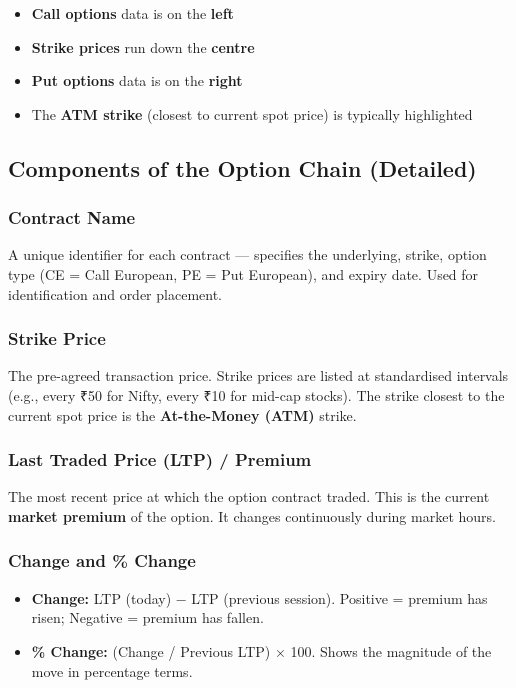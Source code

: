 \documentclass[12pt,openany]{book}
\begin{document}
\begin{itemize}[leftmargin=*]
    \item \textbf{Call options} data is on the \textbf{left}
    \item \textbf{Strike prices} run down the \textbf{centre}
    \item \textbf{Put options} data is on the \textbf{right}
    \item The \textbf{ATM strike} (closest to current spot price) is typically highlighted
\end{itemize}

\subsection{Components of the Option Chain (Detailed)}

\subsubsection{Contract Name}
A unique identifier for each contract — specifies the underlying, strike, option type (CE = Call European, PE = Put European), and expiry date. Used for identification and order placement.

\subsubsection{Strike Price}
The pre-agreed transaction price. Strike prices are listed at standardised intervals (e.g., every ₹50 for Nifty, every ₹10 for mid-cap stocks). The strike closest to the current spot price is the \textbf{At-the-Money (ATM)} strike.

\subsubsection{Last Traded Price (LTP) / Premium}
The most recent price at which the option contract traded. This is the current \textbf{market premium} of the option. It changes continuously during market hours.

\subsubsection{Change and \% Change}

\begin{itemize}[leftmargin=*]
    \item \textbf{Change:} LTP (today) − LTP (previous session). Positive = premium has risen; Negative = premium has fallen.
    \item \textbf{\% Change:} (Change / Previous LTP) × 100. Shows the magnitude of the move in percentage terms.
\end{itemize}
\end{document}
